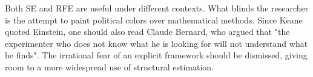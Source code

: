 \documentclass[letterpaper,12pt]{article}
\theoremstyle{definition}
\begin{document}
Both SE and RFE are useful under different contexts. What blinds the researcher is the attempt to paint political colors over mathematical methods. Since Keane quoted Einstein, one should also read Claude Bernard, who argued that "the experimenter who does not know what he is looking for will not understand what he finds". The irrational fear of an explicit framework should be dismissed, giving room to a more widespread use of structural estimation.

\nocite{*}

\end{document}
